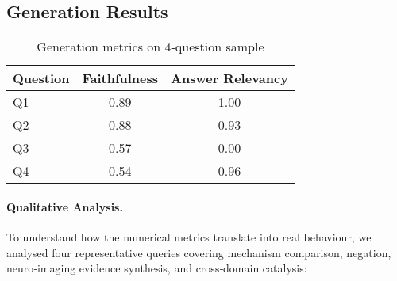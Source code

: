 \documentclass[conference]{IEEEtran}
\begin{document}
\vspace{0.8em}

\subsection{Generation Results}

\begin{table}[ht]
    \centering
    \caption{Generation metrics on 4-question sample}
    \label{tab:generation}
    \begin{tabular*}{\linewidth}{@{\extracolsep{\fill}}lcc}
    \toprule
    \textbf{Question} & \textbf{Faithfulness} & \textbf{Answer Relevancy} \\
    \midrule
    Q1 & 0.89 & 1.00 \\[2pt]
    Q2 & 0.88 & 0.93 \\[2pt]
    Q3 & 0.57 & 0.00 \\[2pt]
    Q4 & 0.54 & 0.96 \\
    \bottomrule
    \end{tabular*}
\end{table}


\paragraph{Qualitative Analysis.}
To understand how the numerical metrics translate into real behaviour, we analysed four representative queries covering mechanism comparison, negation, neuro‑imaging evidence synthesis, and cross‑domain catalysis:
\end{document}
